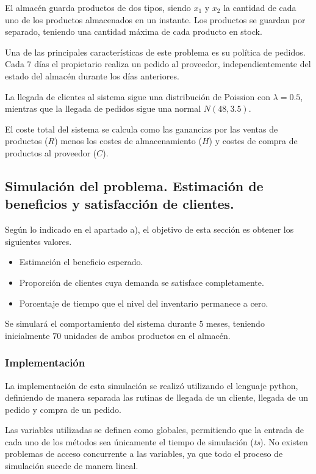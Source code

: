 \documentclass[a4paper,12pt]{article}
\begin{document}
	El almacén guarda productos de dos tipos, siendo $x_1$ y $x_2$ la cantidad de cada uno de los productos almacenados en un instante. Los productos se guardan por separado, teniendo una cantidad máxima de cada producto en stock.
	
	Una de las principales características de este problema es su política de pedidos. Cada $7$ días el propietario realiza un pedido al proveedor, independientemente del estado del almacén durante los días anteriores.
	
	La llegada de clientes al sistema sigue una distribución de Poission con $\lambda = 0.5$, mientras que la llegada de pedidos sigue una normal $N(48, 3.5)$.
	
	El coste total del sistema se calcula como las ganancias por las ventas de productos ($R$) menos los costes de almacenamiento ($H$) y costes de compra de productos al proveedor ($C$).
	
	
	
	\subsection{Simulación del problema. Estimación de beneficios y satisfacción de clientes.}
	Según lo indicado en el apartado a), el objetivo de esta sección es obtener los siguientes valores.
	\begin{itemize}
		\item Estimación el beneficio esperado.
		\item Proporción de clientes cuya demanda se satisface completamente.
		\item Porcentaje de tiempo que el nivel del inventario permanece a cero.
	\end{itemize}
	Se simulará el comportamiento del sistema durante $5$ meses, teniendo inicialmente $70$ unidades de ambos productos en el almacén.
	 	
	\subsubsection{Implementación}
	La implementación de esta simulación se realizó utilizando el lenguaje python, definiendo de manera separada las rutinas de llegada de un cliente, llegada de un pedido y compra de un pedido.
	
	Las variables utilizadas se definen como globales, permitiendo que la entrada de cada uno de los métodos sea únicamente el tiempo de simulación (\textit{ts}). No existen problemas de acceso concurrente a las variables, ya que todo el proceso de simulación sucede de manera lineal.
	
\end{document}
